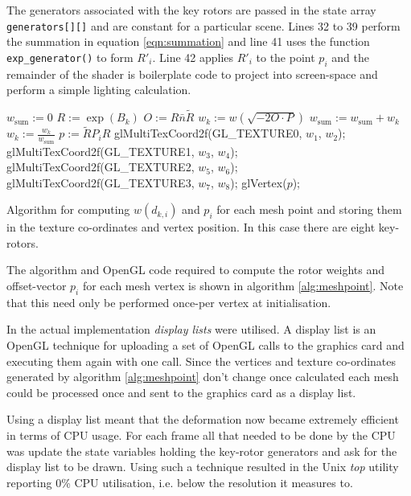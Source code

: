 The generators associated with the key rotors are passed in the state array {\tt generators[][]}
and are constant for a particular scene. Lines 32 to 39 perform the summation in 
equation \ref{eqn:summation} and line 41 uses the function {\tt exp\_generator()} to 
form $R'_i$. Line 42 applies $R'_i$ to the point $p_i$ and the remainder of the shader
is boilerplate code to project into screen-space and perform a simple lighting calculation.

\begin{fancyalg}
\begin{algorithmic}[1]
\STATE $w_{\mathrm{sum}} := 0$
\STATE $R := \exp(B_k)$
\STATE $O := R\bar{n}\tilde{R}$
\STATE $w_k := w(\sqrt{-2 O \cdot P})$
\STATE $w_{\mathrm{sum}} := w_{\mathrm{sum}} + w_k$
\ENDFOR
{}
\STATE $w_k := \frac{w_k}{w_{\mathrm{sum}}}$
\ENDFOR
\STATE $p := \tilde{R}P_iR$
\STATE glMultiTexCoord2f(GL\_TEXTURE0, $w_1$, $w_2$);
\STATE glMultiTexCoord2f(GL\_TEXTURE1, $w_3$, $w_4$); 
\STATE glMultiTexCoord2f(GL\_TEXTURE2, $w_5$, $w_6$);
\STATE glMultiTexCoord2f(GL\_TEXTURE3, $w_7$, $w_8$);
\STATE glVertex($p$);
\end{algorithmic}
\caption{\label{alg:meshpoint}Algorithm for computing $w(d_{k,i})$ and $p_i$ for 
  each mesh point and storing them in the texture co-ordinates and vertex position.
  In this case there are eight key-rotors.}
\end{fancyalg}

The algorithm and OpenGL code required to compute the rotor weights and offset-vector
$p_i$ for each mesh vertex is shown in algorithm \ref{alg:meshpoint}. Note that this
need only be performed once-per vertex at initialisation.

In the actual implementation \emph{display lists} were utilised. A display list 
is an OpenGL technique for uploading a set of OpenGL calls to the graphics card
and executing them again with one call. Since the vertices and texture co-ordinates
generated by algorithm \ref{alg:meshpoint} don't change once calculated each mesh could
be processed once and sent to the graphics card as a display list.

Using a display list meant that the deformation now became extremely efficient in
terms of CPU usage. For each frame all that needed to be done by the CPU was update the
state variables holding the key-rotor generators and ask for the display list to be drawn.
Using such a technique resulted in the Unix \emph{top} utility reporting 0\% CPU utilisation,
i.e. below the resolution it measures to.

